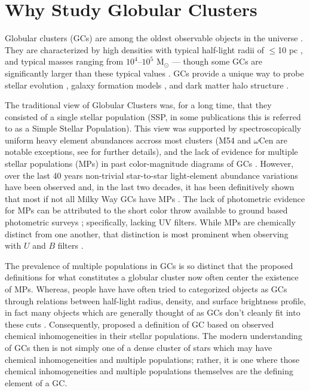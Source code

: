 \chapter{Why Study Globular Clusters}
Globular clusters (GCs) are among the oldest observable objects in the universe
\citep{Pen11}. They are characterized by high densities with typical half-light
radii of $\le$10 pc \citep{Vanderburg2010}, and typical masses ranging from
$10^{4}$--$10^{5}$ M$_{\odot}$ \citep{Bro06} --- though some GCs are
significantly larger than these typical values \citep[e.g. $\omega$Cen,
][]{Richer1991}. GCs provide a unique way to probe stellar evolution
\citep{Bau03}, galaxy formation models \citep{Boy18,Kra05}, and dark matter
halo structure \citep{Hud18}.

The traditional view of Globular Clusters was, for a long time, that they
consisted of a single stellar population (SSP, in some publications this is
referred to as a Simple Stellar Population). This view was supported by
spectroscopically uniform heavy element abundances \citep{Carretta2010, Bastian2018} accross most clusters (M54 and $\omega$Cen are notable exceptions, see \citet{Marino2015} for further details), and the lack of evidence for multiple stellar populations
(MPs) in past color-magnitude diagrams of GCs \citep[i.e.][]{Sandage1953, Alcaino1975}. However, over the last 40 years non-trivial star-to-star light-element abundance variations have been observed \citep[i.e.][]{Smith1987} and, in
the last two decades, it has been definitively shown that most if not all Milky
Way GCs have MPs \citep{Gratton2004, Gratton2012, Piotto2015}. The lack of photometric evidence for MPs
can be attributed to the short color throw available to ground based
photometric surveys \citep{Milone2017}; specifically, lacking UV filters. While MPs are chemically distinct
from one another, that distinction is most prominent when observing with $U$
and $B$ filters \citep{Sbordone2011}.

The prevalence of multiple populations in GCs is so distinct that the proposed
definitions for what constitutes a globular cluster now often center the
existence of MPs. Whereas, people have have often tried to categorized objects
as GCs through relations between half-light radius, density, and surface
brightness profile, in fact many objects which are generally thought of as GCs
don't cleanly fit into these cuts \citep{Peebles1968, Brown1991, Brown1995, Bekki2002}.
Consequently, \citet{Carretta2010} proposed a definition of GC based on
observed chemical inhomogeneities in their stellar populations. The modern
understanding of GCs then is not simply one of a dense cluster of stars which
may have chemical inhomogeneities and multiple populations; rather, it is one
where those chemical inhomogeneities and multiple populations themselves are
the defining element of a GC.

